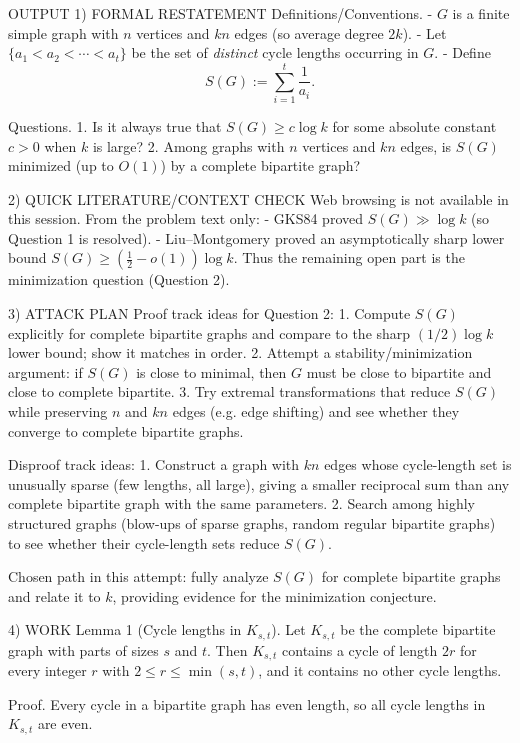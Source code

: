 
OUTPUT
1) FORMAL RESTATEMENT
Definitions/Conventions.
- $G$ is a finite simple graph with $n$ vertices and $kn$ edges (so average degree $2k$).
- Let $\{a_1<a_2<\cdots<a_t\}$ be the set of \emph{distinct} cycle lengths occurring in $G$.
- Define
\[S(G):=\sum_{i=1}^t \frac{1}{a_i}.\]

Questions.
1. Is it always true that $S(G)\ge c\log k$ for some absolute constant $c>0$ when $k$ is large?
2. Among graphs with $n$ vertices and $kn$ edges, is $S(G)$ minimized (up to $O(1)$) by a complete bipartite graph?

2) QUICK LITERATURE/CONTEXT CHECK
Web browsing is not available in this session.
From the problem text only:
- GKS84 proved $S(G)\gg \log k$ (so Question 1 is resolved).
- Liu--Montgomery proved an asymptotically sharp lower bound $S(G)\ge (\tfrac12-o(1))\log k$.
Thus the remaining open part is the minimization question (Question 2).

3) ATTACK PLAN
Proof track ideas for Question 2:
1. Compute $S(G)$ explicitly for complete bipartite graphs and compare to the sharp $(1/2)\log k$ lower bound; show it matches in order.
2. Attempt a stability/minimization argument: if $S(G)$ is close to minimal, then $G$ must be close to bipartite and close to complete bipartite.
3. Try extremal transformations that reduce $S(G)$ while preserving $n$ and $kn$ edges (e.g. edge shifting) and see whether they converge to complete bipartite graphs.

Disproof track ideas:
1. Construct a graph with $kn$ edges whose cycle-length set is unusually sparse (few lengths, all large), giving a smaller reciprocal sum than any complete bipartite graph with the same parameters.
2. Search among highly structured graphs (blow-ups of sparse graphs, random regular bipartite graphs) to see whether their cycle-length sets reduce $S(G)$.

Chosen path in this attempt: fully analyze $S(G)$ for complete bipartite graphs and relate it to $k$, providing evidence for the minimization conjecture.

4) WORK
Lemma 1 (Cycle lengths in $K_{s,t}$).
Let $K_{s,t}$ be the complete bipartite graph with parts of sizes $s$ and $t$.
Then $K_{s,t}$ contains a cycle of length $2r$ for every integer $r$ with $2\le r\le \min(s,t)$, and it contains no other cycle lengths.

Proof.
Every cycle in a bipartite graph has even length, so all cycle lengths in $K_{s,t}$ are even.


